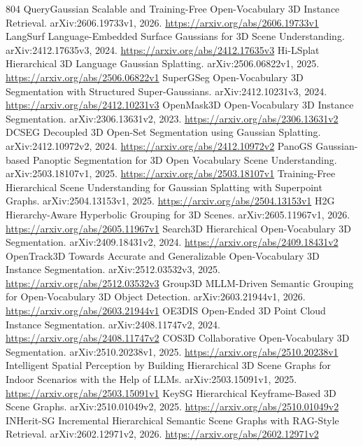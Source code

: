 \documentclass[11pt]{article}
\begin{document}
\begin{thebibliography}{804}
 QueryGaussian Scalable and Training-Free Open-Vocabulary 3D Instance Retrieval. arXiv:2606.19733v1, 2026. \url{https://arxiv.org/abs/2606.19733v1}
 LangSurf Language-Embedded Surface Gaussians for 3D Scene Understanding. arXiv:2412.17635v3, 2024. \url{https://arxiv.org/abs/2412.17635v3}
 Hi-LSplat Hierarchical 3D Language Gaussian Splatting. arXiv:2506.06822v1, 2025. \url{https://arxiv.org/abs/2506.06822v1}
 SuperGSeg Open-Vocabulary 3D Segmentation with Structured Super-Gaussians. arXiv:2412.10231v3, 2024. \url{https://arxiv.org/abs/2412.10231v3}
 OpenMask3D Open-Vocabulary 3D Instance Segmentation. arXiv:2306.13631v2, 2023. \url{https://arxiv.org/abs/2306.13631v2}
 DCSEG Decoupled 3D Open-Set Segmentation using Gaussian Splatting. arXiv:2412.10972v2, 2024. \url{https://arxiv.org/abs/2412.10972v2}
 PanoGS Gaussian-based Panoptic Segmentation for 3D Open Vocabulary Scene Understanding. arXiv:2503.18107v1, 2025. \url{https://arxiv.org/abs/2503.18107v1}
 Training-Free Hierarchical Scene Understanding for Gaussian Splatting with Superpoint Graphs. arXiv:2504.13153v1, 2025. \url{https://arxiv.org/abs/2504.13153v1}
 H2G Hierarchy-Aware Hyperbolic Grouping for 3D Scenes. arXiv:2605.11967v1, 2026. \url{https://arxiv.org/abs/2605.11967v1}
 Search3D Hierarchical Open-Vocabulary 3D Segmentation. arXiv:2409.18431v2, 2024. \url{https://arxiv.org/abs/2409.18431v2}
 OpenTrack3D Towards Accurate and Generalizable Open-Vocabulary 3D Instance Segmentation. arXiv:2512.03532v3, 2025. \url{https://arxiv.org/abs/2512.03532v3}
 Group3D MLLM-Driven Semantic Grouping for Open-Vocabulary 3D Object Detection. arXiv:2603.21944v1, 2026. \url{https://arxiv.org/abs/2603.21944v1}
 OE3DIS Open-Ended 3D Point Cloud Instance Segmentation. arXiv:2408.11747v2, 2024. \url{https://arxiv.org/abs/2408.11747v2}
 COS3D Collaborative Open-Vocabulary 3D Segmentation. arXiv:2510.20238v1, 2025. \url{https://arxiv.org/abs/2510.20238v1}
 Intelligent Spatial Perception by Building Hierarchical 3D Scene Graphs for Indoor Scenarios with the Help of LLMs. arXiv:2503.15091v1, 2025. \url{https://arxiv.org/abs/2503.15091v1}
 KeySG Hierarchical Keyframe-Based 3D Scene Graphs. arXiv:2510.01049v2, 2025. \url{https://arxiv.org/abs/2510.01049v2}
 INHerit-SG Incremental Hierarchical Semantic Scene Graphs with RAG-Style Retrieval. arXiv:2602.12971v2, 2026. \url{https://arxiv.org/abs/2602.12971v2}

\end{thebibliography}
\end{document}
